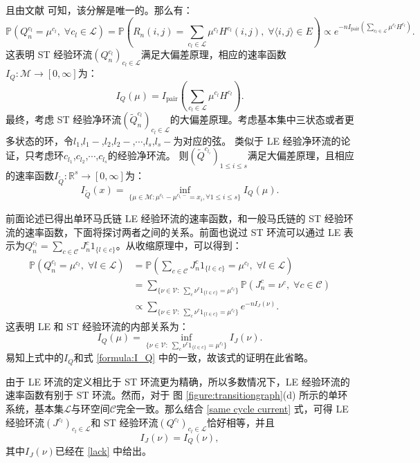 且由文献 \cite{kalpazidou2007cycle}可知，该分解是唯一的。那么有：
\begin{equation*}
    \mathbb{P}(Q_n^{c_l}=\mu^{c_l},\;\forall c_l\in\mathcal{L})
    =\mathbb{P}\left(R_n(i,j)=\sum_{c_l\in\mathcal{L}}\mu^{c_l}H^{c_l}(i,j),\;\forall\langle i,j\rangle\in E\right)
    \propto e^{-n I_{\mathrm{pair}}\left(\sum_{c_l\in\mathcal{L}}\mu^{c_l}H^{c_l}\right)}.
\end{equation*}
这表明 ST 经验环流$(Q_n^{c_l})_{c_l\in\mathcal{L}}$满足大偏差原理，相应的速率函数$I_Q:\mathcal{M}\rightarrow[0,\infty]$为：
\begin{equation}\label{formula:I_Q}
I_Q(\mu)=I_{\mathrm{pair}}\left(\sum_{c_l\in\mathcal{L}}\mu^{c_l}H^{c_l}\right).
\end{equation}
最终，考虑 ST 经验净环流$(\tilde{Q}^{c_l}_n)_{c_l\in\mathcal{L}}$的大偏差原理。考虑基本集中三状态或者更多状态的环，令$l_1$,$l_1-$,$l_2$,$l_2-$,$\cdots$,$l_s$,$l_s-$为对应的弦。 类似于 LE 经验净环流的论证，只考虑环$c_{l_1}$,$c_{l_2}$,$\cdots$,$c_{l_s}$的经验净环流。 则$(\tilde{Q}^{c_{l_i}})_{1\le i\le s}$满足大偏差原理，且相应的速率函数$I_{\tilde{Q}}:\mathbb{R}^s\rightarrow[0,\infty]$为：
\begin{equation}\label{I_Q2}
	I_{\tilde{Q}}(x)=\inf_{\{\mu\in\mathcal{M}:\mu^{c_{l_{i}}}-\mu^{c_{l_{i}}-}= x_i,\forall 1\le i\le s\}}I_Q(\mu).
\end{equation}

前面论述已得出单环马氏链 LE 经验环流的速率函数，和一般马氏链的 ST 经验环流的速率函数，下面将探讨两者之间的关系。前面也说过 ST 环流可以通过 LE 表示为$Q_n^{c_l} = \sum_{c\in\mathcal{C}}J^c_n1_{\{l\in c\}}$。从收缩原理中，可以得到：
\begin{align*}
	\mathbb{P}\left(Q_n^{c_l}=\mu^{c_l},\;\forall l\in\mathcal{L}\right)
	&= \mathbb{P}\left(\sum_{c\in\mathcal{C}}J^c_n1_{\{l\in c\}}=\mu^{c_l},\;\forall l\in\mathcal{L}\right)\\
	&= \sum_{\{\nu\in\mathcal{V}:\;\sum_c\nu^c1_{\{l\in c\}}=\mu^{c_l}\}}
	\mathbb{P}\left(J^c_n=\nu^c,\;\forall c\in\mathcal{C}\right)\\
	&\propto \sum_{\{\nu\in\mathcal{V}:\;\sum_c\nu^c1_{\{l\in c\}}=\mu^{c_l}\}}e^{-nI_J(\nu)}.
\end{align*}
这表明 LE 和 ST 经验环流的内部关系为：
\begin{equation*}
	I_Q(\mu) = \inf_{\{\nu\in\mathcal{V}:\;\sum_c\nu^c1_{\{l\in c\}}=\mu^{c_l}\}}I_J(\nu).
\end{equation*}
易知上式中的$I_Q$和式 \eqref{formula:I_Q} 中的一致，故该式的证明在此省略。

由于 LE 环流的定义相比于 ST 环流更为精确，所以多数情况下，LE 经验环流的速率函数有别于 ST 环流。然而，对于 图 \ref{figure:transitiongraph}(d) 所示的单环系统，基本集$\mathcal{L}$与环空间$\mathcal{C}$完全一致。那么结合 \eqref{same cycle current} 式，可得 LE 经验环流$(J^{c_l})_{c_l\in\mathcal{L}}$和 ST 经验环流$(Q^{c_l})_{c_l\in\mathcal{L}}$恰好相等，并且 
\begin{equation*}
	I_J(\nu) = I_Q(\nu),
\end{equation*}
其中$I_J(\nu)$已经在 \eqref{lack} 中给出。